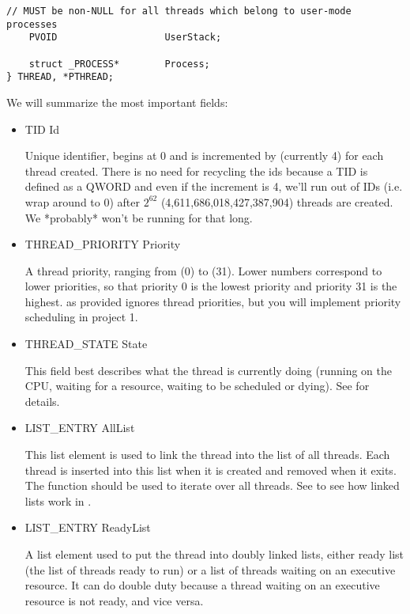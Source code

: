 \begin{appendices}
\begin{lstlisting}[caption={Thread structure},label={lst:ThreadStruct}]
    // MUST be non-NULL for all threads which belong to user-mode processes
    PVOID                   UserStack;

    struct _PROCESS*        Process;
} THREAD, *PTHREAD;
\end{lstlisting}

We will summarize the most important fields:
\begin{itemize}
	\item TID Id

	Unique identifier, begins at 0 and is incremented by  (currently 4) for
each thread created. There is no need for recycling the ids because a TID is defined as a QWORD and
 even if the increment is 4, we'll run out of IDs (i.e. wrap around to 0) after \begin{math}2^{62}\end{math}
(4,611,686,018,427,387,904) threads are created. We *probably* won't be running for that long.

	\item THREAD\_PRIORITY Priority

	A thread priority, ranging from  (0) to 
 (31). Lower numbers correspond to lower priorities, so that priority 0
is the lowest priority and priority 31 is the highest. \projectname as provided ignores thread 
priorities, but you will implement priority scheduling in project 1.

	\item THREAD\_STATE State

	This field best describes what the thread is currently doing (running on the CPU, waiting for a
resource, waiting to be scheduled or dying). See  for details.

	\item LIST\_ENTRY AllList

	This list element is used to link the thread into the list of all threads. Each thread
is inserted into this list when it is created and removed when it exits. The 
 function should be used to iterate over all threads. See
 to see how linked lists work in \projectname.

	\item LIST\_ENTRY ReadyList

	A list element used to put the thread into doubly linked lists, either ready list (the list of 
threads ready to run) or a list of threads waiting on an executive resource. It can do double duty
because a thread waiting on an executive resource is not ready, and vice versa.


\end{itemize}
\end{appendices}
